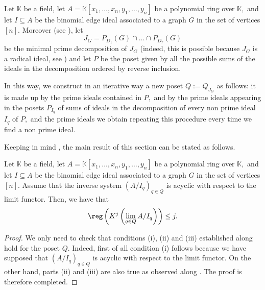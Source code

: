 \documentclass[11pt]{amsart}
\begin{document}
\begin{cons}
Let $\mathbb{K}$ be a field, let $A=\mathbb{K}[x_1,\ldots,x_n,y_1,\ldots,y_n]$ be a polynomial ring over $\mathbb{K},$ and let $I\subseteq A$ be the binomial edge ideal associated to a graph $G$ in the set of vertices $[n].$ Moreover (see \cite[Theorem 7.16]{HerzogHibiOhsugibinomialidealsbook}), let
\[
J_G=P_{D_1} (G)\cap\ldots\cap P_{D_r} (G)
\]
be the minimal prime decomposition of $J_G$ (indeed, this is possible because $J_G$ is a radical ideal, see \cite[Corollary 7.13]{HerzogHibiOhsugibinomialidealsbook}) and let $P$ be the poset given by all the possible sums of the ideals in the decomposition ordered by reverse inclusion.

In this way, we construct in an iterative way a new poset $Q:=Q_{J_G}$ as follows: it is made up by the prime ideals contained in $P,$ and by the prime ideals appearing in the posets $P_{I_q}$ of sums of ideals in the decomposition of every non prime ideal $I_q$ of $P,$ and the prime ideals we obtain repeating this procedure every time we find a non prime ideal.
\end{cons}

Keeping in mind , the main result of this section can be stated as follows.

\begin{teo}
Let $\mathbb{K}$ be a field, let $A=\mathbb{K}[x_1,\ldots,x_n,y_1,\ldots,y_n]$ be a polynomial ring over $\mathbb{K},$ and let $I\subseteq A$ be the binomial edge ideal associated to a graph $G$ in the set of vertices $[n]$. Assume that the inverse system $(A/I_q)_{q\in Q}$ is acyclic with respect to the limit functor. Then, we have that
\[
\reg\left(K^j\left(\lim_{q\in Q}A/I_q\right)\right)\leq j.
\]
\end{teo}

\begin{proof}
We only need to check that conditions (i), (ii) and (iii) established along  hold for the poset $Q$. Indeed, first of all condition (i) follows because we have supposed that $(A/I_q)_{q\in Q}$ is acyclic with respect to the limit functor. On the other hand, parts (ii) and (iii) are also true as observed along \cite[page 338, paragraph before Discussion 3.6]{AlvarezMontaner2020}. The proof is therefore completed.
\end{proof}
\end{document}
